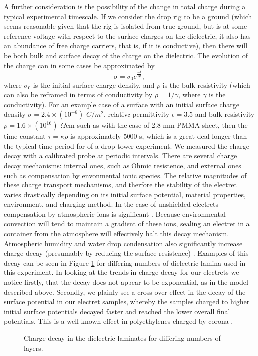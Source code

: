 \documentclass[12pt,a4paper,oneside]{book}
\begin{document}
A further consideration is the possibility of the change in total charge during a typical experimental timescale. If we consider the drop rig to be a ground (which seems reasonable given that the rig is isolated from true ground, but is at some reference voltage with respect to the surface charges on the dielectric, it also has an abundance of free charge carriers, that is, if it is conductive), then there will be both bulk and surface decay of the charge on the dielectric. The evolution of the charge can in some cases be approximated by
\[ \sigma = \sigma_0 e^{\frac{-t}{\epsilon \rho}}, \]
where $\sigma_0$ is the initial surface charge density, and $\rho$ is the bulk resistivity (which can also be reframed in terms of conductivity by $\rho = 1/\gamma$, where $\gamma$ is the conductivity). For an example case of a surface with an initial surface charge density $\sigma = 2.4 \times (10^{-6})$ $C/m^2$, relative permittivity $\epsilon = 3.5$ and bulk resistivity $\rho = 1.6 \times (10^{16})$ $\Omega$cm such as with the case of 2.8 mm PMMA sheet, then the time constant $\tau = \kappa \rho$ is approximately 5000 s, which is a great deal longer than the typical time period for of a drop tower experiment. We measured the charge decay with a calibrated probe at periodic intervals. There are several charge decay mechanisms: internal ones, such as Ohmic resistence, and external ones such as compensation by envonmental ionic species. The relative magnitudes of these charge transport mechanisms, and therfore the stability of the electret varies drastically depending on its initial surface potential, material properties, environment, and charging method. In the case of unshielded electrets compensation by atmospheric ions is significant \cite{perlman_electrets_1973}. Because environmental convection will tend to  maintain a gradient of these ions, sealing an electret in a container from the atmosphere will effectively halt this decay mechanism. Atmospheric humidity and water drop condensation also significantly increase charge decay (presumably by reducing the surface resistence) \cite{haenen_characteristic_1975}. Examples of this decay can be seen in Figure \ref{fig:charge_decay} for differing numbers of dielectric lamina used in this experiment. In looking at the trends in charge decay for our electrets we notice firstly, that the decay does not appear to be exponential, as in the model described above. Secondly, we plainly see a cross-over effect in the decay of the surface potential in our electret samples, whereby the samples charged to higher initial surface potentials decayed faster and reached the lower overall final potentials. This is a well known effect in polyethylenes charged by corona \cite{ferreira_corona_1992}.
\begin{figure}[htb!]
    \centering
    {}
       \caption{Charge decay in the dielectric laminates for differing numbers of layers.\label{fig:charge_decay}}
\end{figure}
\newpage
\end{document}
